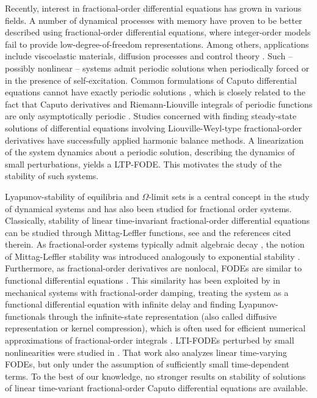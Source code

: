 \documentclass{svproc}
\begin{document}
	{%
		Recently, interest in fractional-order differential equations has grown in various fields. A number of dynamical processes with memory have proven to be better described using fractional-order differential equations, where integer-order models fail to provide low-degree-of-freedom representations. Among others, applications include viscoelastic materials, diffusion processes and control theory \cite{Das2011}. Such – possibly nonlinear – systems admit periodic solutions when periodically forced or in the presence of self-excitation. Common formulations of Caputo differential equations cannot have exactly periodic solutions \cite{Tavazoei2009}, which is closely related to the fact that Caputo derivatives and Riemann-Liouville integrals of periodic functions are only asymptotically periodic \cite{Area2016}. Studies \cite{Rand2010,Daibiri2015} concerned with finding steady-state solutions of differential equations involving Liouville-Weyl-type fractional-order derivatives have successfully applied harmonic balance methods. A linearization of the system dynamics about a periodic solution, describing the dynamics of small perturbations, yields a LTP-FODE. This motivates the study of the stability of such systems.
		
		Lyapunov-stability of equilibria and $\Omega$-limit sets is a central concept in the study of dynamical systems and has also been studied for fractional order systems. Classically, stability of linear time-invariant fractional-order differential equations can be studied through Mittag-Leffler functions, see \cite{Diethelm2010} and the references cited therein. As fractional-order systems typically admit algebraic decay \cite{CongEtAl2020}, the notion of Mittag-Leffler stability was introduced analogously to exponential stability \cite{LiEtAl2009}. Furthermore, as fractional-order derivatives are nonlocal, FODEs are similar to functional differential equations \cite{Hale1977}. This similarity has been exploited by \cite{Hinze2020,Hinze2020a} in mechanical systems with fractional-order damping, treating the system as a functional differential equation with infinite delay and finding Lyapunov-functionals through the infinite-state representation (also called diffusive representation or kernel compression), which is often used for efficient numerical approximations of fractional-order integrals \cite{Chaudhary2024}. LTI-FODEs perturbed by small nonlinearities were studied in \cite{CongEtAl2018}. That work also analyzes linear time-varying FODEs, but only under the assumption of sufficiently small time-dependent terms. To the best of our knowledge, no stronger results on stability of solutions of linear time-variant fractional-order Caputo differential equations are available.
		
}
\end{document}
